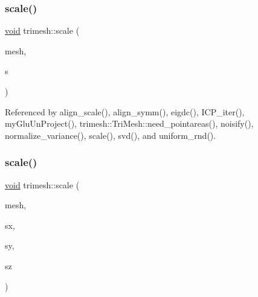 \mbox{\label{namespacetrimesh_a7ab42ca91e0f6e2913219091b098fc4b}} 
\subsubsection{\texorpdfstring{scale()}{scale()}\hspace{0.1cm}{\footnotesize\ttfamily [1/3]}}
{\footnotesize\ttfamily \hyperlink{namespacetrimesh_a784ddfd979e1c579bda795a8edfc3f43}{void} trimesh\+::scale (\begin{DoxyParamCaption}\item[{\hyperlink{classtrimesh_1_1TriMesh}{Tri\+Mesh} $\ast$}]{mesh,  }\item[{float}]{s }\end{DoxyParamCaption})}



Referenced by align\+\_\+scale(), align\+\_\+symm(), eigdc(), I\+C\+P\+\_\+iter(), my\+Glu\+Un\+Project(), trimesh\+::\+Tri\+Mesh\+::need\+\_\+pointareas(), noisify(), normalize\+\_\+variance(), scale(), svd(), and uniform\+\_\+rnd().

\mbox{\label{namespacetrimesh_a9589dc160b5d9615c33a31cd6c68cd9d}} 
\subsubsection{\texorpdfstring{scale()}{scale()}\hspace{0.1cm}{\footnotesize\ttfamily [2/3]}}
{\footnotesize\ttfamily \hyperlink{namespacetrimesh_a784ddfd979e1c579bda795a8edfc3f43}{void} trimesh\+::scale (\begin{DoxyParamCaption}\item[{\hyperlink{classtrimesh_1_1TriMesh}{Tri\+Mesh} $\ast$}]{mesh,  }\item[{float}]{sx,  }\item[{float}]{sy,  }\item[{float}]{sz }\end{DoxyParamCaption})}

\mbox{\label{namespacetrimesh_acfb0b9b5e4ca98a5a9f3a8d41d86d2ee}} 
